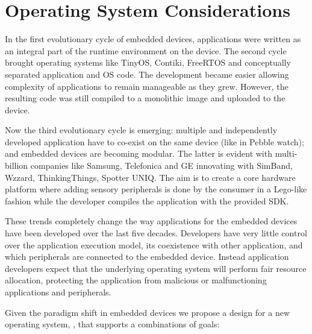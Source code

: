 \section{Operating System Considerations}
\label{os-considerations}

In the first evolutionary cycle of embedded devices, applications were written
as an integral part of the runtime environment on the device. The second
cycle brought operating systems like TinyOS, Contiki, FreeRTOS and conceptually
separated application and OS code. The development became easier allowing
complexity of applications to remain manageable as they grew. However, the resulting
code was still compiled to a monolithic image and uploaded to the device.

Now the third evolutionary cycle is emerging: multiple and independently
developed application have to co-exist on the same device (like in Pebble watch);
and embedded devices are becoming modular. The latter is evident with
multi-billion companies like Samsung, Telefonica and GE innovating with SimBand, Wzzard, ThinkingThings, Spotter UNIQ.
The aim is to create a core hardware platform where adding sensory
peripherals is done by the consumer in a Lego-like fashion while the developer compiles the
application with the provided SDK. %

These trends completely change the way applications for the embedded devices
have been developed over the last five decades. Developers have very little control over the
application execution model, its coexistence with other application, and which
peripherals are connected to the embedded device. Instead application developers
expect that the underlying operating system will perform fair resource allocation,
protecting the application from malicious or malfunctioning applications and
peripherals. 

Given the paradigm shift in embedded devices we propose a design for a new operating system,
\name, that supports a combinations of goals:


